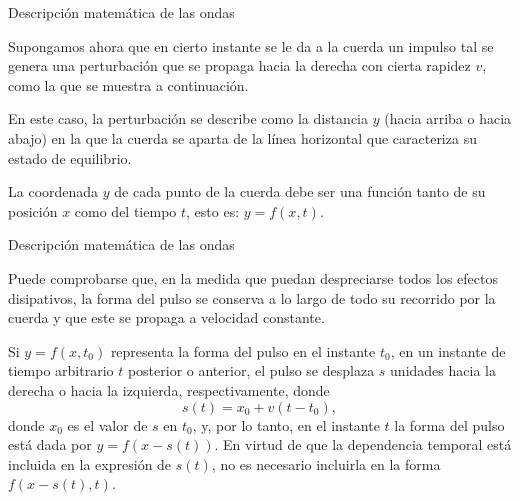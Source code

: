 \documentclass[11pt,handout,aspectratio=1610]{beamer}
\newcommand{\vs}{\vspace{11pt}}
\begin{document}
\begin{frame}{Descripción matemática de las ondas}

    Supongamos ahora que en cierto instante se le da a la cuerda un impulso tal se genera una perturbación que se propaga hacia la derecha con cierta rapidez $v$, como la que se muestra a continuación.

    \begin{figure}
        \centering
    \end{figure}

    En este caso, la perturbación se describe como la distancia $y$ (hacia arriba o hacia abajo) en la que la cuerda se aparta de la línea horizontal que caracteriza su estado de equilibrio.

    \vs

    La coordenada $y$ de cada punto de la cuerda debe ser una función tanto de su posición $x$ como del tiempo $t$, esto es: $y = f(x,t)$. 

\end{frame}

\begin{frame}{Descripción matemática de las ondas}

    Puede comprobarse que, en la medida que puedan despreciarse todos los efectos disipativos, la forma del pulso se conserva a lo largo de todo su recorrido por la cuerda y que este se propaga a velocidad constante.

    \vs 

    Si $y = f(x,t_0)$ representa la forma del pulso en el instante $t_0$, en un instante de tiempo arbitrario $t$ posterior o anterior, el pulso se desplaza $s$ unidades hacia la derecha o hacia la izquierda, respectivamente, donde $$ s(t) = x_0 + v \left(t - t_0\right), $$ donde $x_0$ es el valor de $s$ en $t_0$, y, por lo tanto, en el instante $t$ la forma del pulso está dada por $y = f(x-s(t))$. En virtud de que la dependencia temporal está incluida en la expresión de $s(t)$, no es necesario incluirla en la forma $f(x-s(t),t)$.
 
\end{frame}
\end{document}
